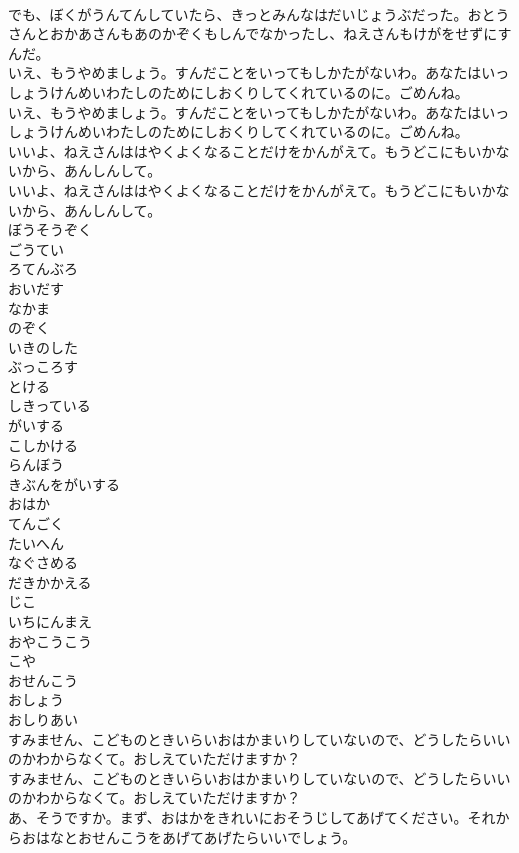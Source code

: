 \documentclass[8pt]{extreport}
\begin{document}
\begin{CJK}{UTF8}{min}
\\	でも、ぼくがうんてんしていたら、きっとみんなはだいじょうぶだった。おとうさんとおかあさんもあのかぞくもしんでなかったし、ねえさんもけがをせずにすんだ。
\\	いえ、もうやめましょう。すんだことをいってもしかたがないわ。あなたはいっしょうけんめいわたしのためにしおくりしてくれているのに。ごめんね。
\\	いえ、もうやめましょう。すんだことをいってもしかたがないわ。あなたはいっしょうけんめいわたしのためにしおくりしてくれているのに。ごめんね。
\\	いいよ、ねえさんははやくよくなることだけをかんがえて。もうどこにもいかないから、あんしんして。
\\	いいよ、ねえさんははやくよくなることだけをかんがえて。もうどこにもいかないから、あんしんして。
\\	ぼうそうぞく
\\	ごうてい
\\	ろてんぶろ
\\	おいだす
\\	なかま
\\	のぞく
\\	いきのした
\\	ぶっころす
\\	とける
\\	しきっている
\\	がいする
\\	こしかける
\\	らんぼう
\\	きぶんをがいする
\\	おはか
\\	てんごく
\\	たいへん
\\	なぐさめる
\\	だきかかえる
\\	じこ
\\	いちにんまえ
\\	おやこうこう
\\	こや
\\	おせんこう
\\	おしょう
\\	おしりあい
\\	すみません、こどものときいらいおはかまいりしていないので、どうしたらいいのかわからなくて。おしえていただけますか？
\\	すみません、こどものときいらいおはかまいりしていないので、どうしたらいいのかわからなくて。おしえていただけますか？
\\	あ、そうですか。まず、おはかをきれいにおそうじしてあげてください。それからおはなとおせんこうをあげてあげたらいいでしょう。

\end{CJK}
\end{document}
